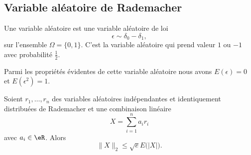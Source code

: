 \subsection{Variable aléatoire de Rademacher}

Une variable aléatoire  est une variable aléatoire de loi
\begin{equation}
	\epsilon\sim \delta_0-\delta_1,
\end{equation}
sur l'ensemble \( \Omega=\{ 0,1 \}\). C'est la variable aléatoire qui prend valeur \( 1\) ou \( -1\) avec probabilité \( \frac{ 1 }{2}\).

Parmi les propriétés évidentes de cette variable aléatoire nous avons \( E(\epsilon)=0\) et \( E(\epsilon^2)=1\).

\begin{proposition}  \label{PropCZRNRsf}
	Soient \( r_1,\ldots, r_n\) des variables aléatoires indépendantes et identiquement distribuées de Rademacher et une combinaison linéaire
	\begin{equation}
		X=\sum_{i=1}^na_ir_i
	\end{equation}
	avec \( a_i\in \eR\). Alors
	\begin{equation}    \label{EqYBZlMga}
		\| X \|_2\leq \sqrt{e}E\big( |X| \big).
	\end{equation}
\end{proposition}

